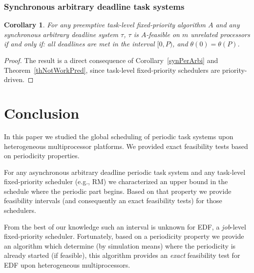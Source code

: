 \documentclass[a4paper,11pt]{article}
\newcommand{\EDF}{\textrm{EDF}}
\newcommand{\RM}{\textrm{RM}}
\newtheorem{Corollary}[Theorem]{Corollary}
\begin{document}
\subsubsection{Synchronous arbitrary deadline task
  systems} \label{labelSectFebSynch2}

\begin{Corollary}\label{fixIdent2bis} For any preemptive task-level fixed-priority
  algorithm $A$ and any synchronous arbitrary deadline system $\tau$,
  $\tau$ is $A$-feasible on $m$ unrelated processors if and only if: all deadlines are met in the interval $[0, P)$, and $\theta(0) = \theta(P)$. 
\end{Corollary}

\begin{proof}
  The result is a direct consequence of Corollary~\ref{synPerArbi} and
  Theorem~\ref{thNotWorkPred}, since task-level fixed-priority schedulers are
  priority-driven.
\end{proof}

\section{Conclusion} \label{conclusion}
In this paper we studied the global scheduling of periodic task systems upon heterogeneous multiprocessor platforms. We provided exact feasibility tests based on periodicity properties. 

For any asynchronous arbitrary deadline periodic task system and any task-level fixed-priority scheduler (e.g., \RM) we characterized an upper bound in the schedule where the periodic part begins. Based on that property we provide   feasibility intervals (and consequently an exact feasibility tests) for those schedulers.

From the best of our knowledge such an interval is unknown for \EDF, a \emph{job}-level fixed-priority scheduler. Fortunately, based on a periodicity property we provide an algorithm which determine (by simulation means) where the periodicity is already started (if feasible), this algorithm provides an \emph{exact} feasibility test for \EDF{} upon heterogeneous multiprocessors.



\end{document}
